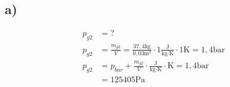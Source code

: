 

\subsection*{a)}
\begin{align*}
    p_{g2} &= ? \\
    p_{g2} &= \frac{m_{g2}}{V} = \frac{37,4 \text{kg}}{0,03 \text{m}^3} \cdot 1 \frac{\text{J}}{\text{kg} \cdot \text{K}} \cdot 1 \text{K} = 1,4 \text{bar} \\
    p_{g2} &= p_{bar} + \frac{m_{g2}}{V} \cdot \frac{\text{J}}{\text{kg} \cdot \text{K}} \cdot \text{K} = 1,4 \text{bar} \\
    &= 125405 \text{Pa}
\end{align*}